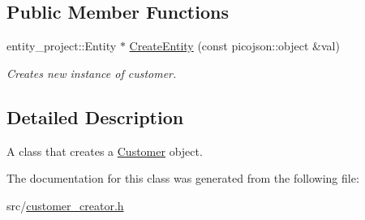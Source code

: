\subsection*{Public Member Functions}
\begin{DoxyCompactItemize}
\item 
\mbox{\label{classcsci3081_1_1CustomerCreator_accb94140d70211f6ac637099656d4eda}} 
entity\+\_\+project\+::\+Entity $\ast$ \hyperlink{classcsci3081_1_1CustomerCreator_accb94140d70211f6ac637099656d4eda}{Create\+Entity} (const picojson\+::object \&val)
\begin{DoxyCompactList}\small\item\em Creates new instance of customer. \end{DoxyCompactList}\end{DoxyCompactItemize}


\subsection{Detailed Description}
A class that creates a \hyperlink{classcsci3081_1_1Customer}{Customer} object. 

The documentation for this class was generated from the following file\+:\begin{DoxyCompactItemize}
\item 
src/\hyperlink{customer__creator_8h}{customer\+\_\+creator.\+h}\end{DoxyCompactItemize}
